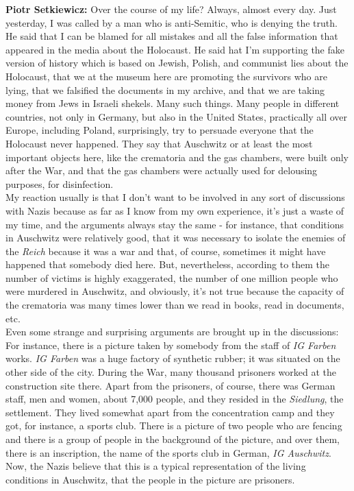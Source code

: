 \textbf{Piotr Setkiewicz:} Over the course of my life? Always, almost every day. Just yesterday, I was called by a man who is anti-Semitic, who is denying the truth. He said that I can be blamed for all mistakes and all the false information that appeared in the media about the Holocaust. He said hat I'm supporting the fake version of history which is based on Jewish, Polish, and communist lies about the Holocaust, that we at the museum here are promoting the survivors who are lying, that we falsified the documents in my archive, and that we are taking money from Jews in Israeli shekels. Many such things. Many people in different countries, not only in Germany, but also in the United States, practically all over Europe, including Poland, surprisingly, try to persuade everyone that the Holocaust never happened. They say that Auschwitz or at least the most important objects here, like the crematoria and the gas chambers, were built only after the War, and that the gas chambers were actually used for delousing purposes, for disinfection.\\ 
My reaction usually is that I don't want to be involved in any sort of discussions with Nazis because as far as I know from my own experience, it's just a waste of my time, and the arguments always stay the same - for instance, that conditions in Auschwitz were relatively good, that it was necessary to isolate the enemies of the \textit{Reich} because it was a war and that, of course, sometimes it might have happened that somebody died here. But, nevertheless, according to them the number of victims is highly exaggerated, the number of one million people who were murdered in Auschwitz, and obviously, it's not true because the capacity of the crematoria was many times lower than we read in books, read in documents, etc.\\ 
Even some strange and surprising arguments are brought up in the discussions: For instance, there is a picture taken by somebody from the staff of \textit{IG Farben} works. \textit{IG Farben} was a huge factory of synthetic rubber; it was situated on the other side of the city. During the War, many thousand prisoners worked at the construction site there. Apart from the prisoners, of course, there was German staff, men and women, about 7,000 people, and they resided in the \textit{Siedlung}, the settlement. They lived somewhat apart from the concentration camp and they got, for instance, a sports club. There is a picture of two people who are fencing and there is a group of people in the background of the picture, and over them, there is an inscription, the name of the sports club in German, \textit{IG Auschwitz}. Now, the Nazis believe that this is a typical representation of the living conditions in Auschwitz, that the people in the picture are prisoners.\\ 
